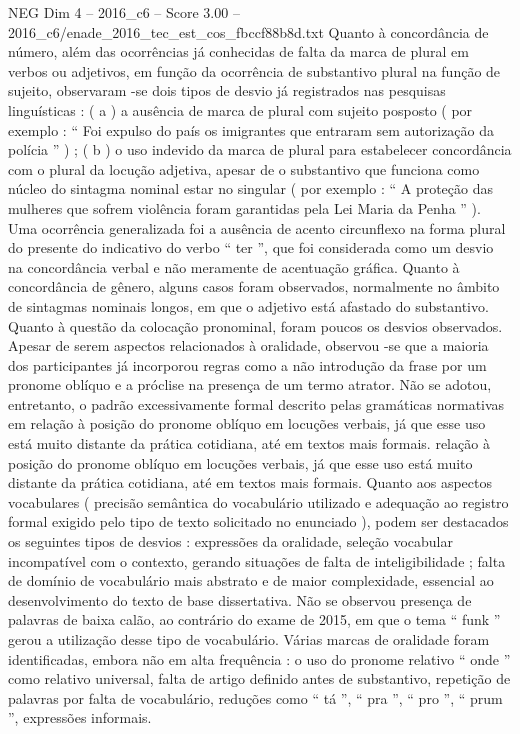 \begin{textsample}{NEG Dim 4 – 2016\_c6 – Score 3.00 – 2016\_c6/enade\_2016\_tec\_est\_cos\_fbccf88b8d.txt}
Quanto à concordância de número, além das ocorrências já conhecidas de falta da marca de plural em verbos ou adjetivos, em função da ocorrência de substantivo plural na função de sujeito, observaram -se dois tipos de desvio já registrados nas pesquisas linguísticas : ( a ) a ausência de marca de plural com sujeito posposto ( por exemplo : “ Foi expulso do país os imigrantes que entraram sem autorização da polícia ” ) ; ( b ) o uso indevido da marca de plural para estabelecer concordância com o plural da locução adjetiva, apesar de o substantivo que funciona como núcleo do sintagma nominal estar no singular ( por exemplo : “ A proteção das mulheres que sofrem violência foram garantidas pela Lei Maria da Penha ” ).
Uma ocorrência generalizada foi a ausência de acento circunflexo na forma plural do presente do indicativo do verbo “ ter ”, que foi considerada como um desvio na concordância verbal e não meramente de acentuação gráfica.
Quanto à concordância de gênero, alguns casos foram observados, normalmente no âmbito de sintagmas nominais longos, em que o adjetivo está afastado do substantivo.
Quanto à questão da colocação pronominal, foram poucos os desvios observados.
Apesar de serem aspectos relacionados à oralidade, observou -se que a maioria dos participantes já incorporou regras como a não introdução da frase por um pronome oblíquo e a próclise na presença de um termo atrator.
Não se adotou, entretanto, o padrão excessivamente formal descrito pelas gramáticas normativas em relação à posição do pronome oblíquo em locuções verbais, já que esse uso está muito distante da prática cotidiana, até em textos mais formais. relação à posição do pronome oblíquo em locuções verbais, já que esse uso está muito distante da prática cotidiana, até em textos mais formais.
Quanto aos aspectos vocabulares ( precisão semântica do vocabulário utilizado e adequação ao registro formal exigido pelo tipo de texto solicitado no enunciado ), podem ser destacados os seguintes tipos de desvios : expressões da oralidade, seleção vocabular incompatível com o contexto, gerando situações de falta de inteligibilidade ; falta de domínio de vocabulário mais abstrato e de maior complexidade, essencial ao desenvolvimento do texto de base dissertativa.
Não se observou presença de palavras de baixa calão, ao contrário do exame de 2015, em que o tema “ funk ” gerou a utilização desse tipo de vocabulário.
Várias marcas de oralidade foram identificadas, embora não em alta frequência : o uso do pronome relativo “ onde ” como relativo universal, falta de artigo definido antes de substantivo, repetição de palavras por falta de vocabulário, reduções como “ tá ”, “ pra ”, “ pro ”, “ prum ”, expressões informais.

\end{textsample}
